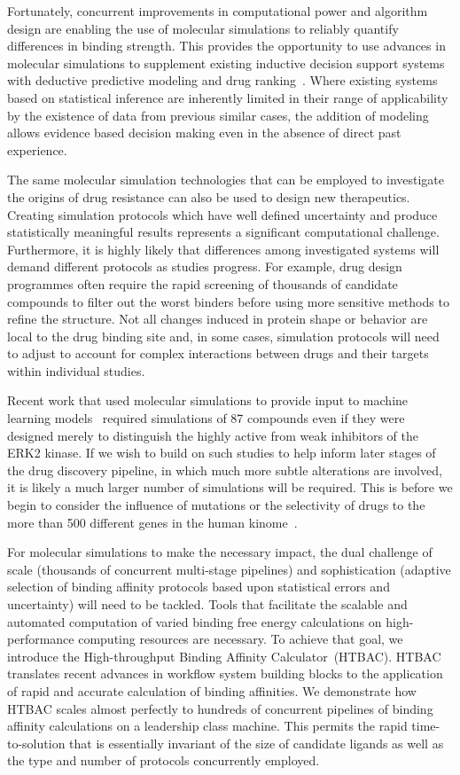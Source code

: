 Fortunately, concurrent improvements in computational power and algorithm
design are enabling the use of molecular simulations to reliably quantify
differences in binding strength. This provides the opportunity to use
advances in molecular simulations to supplement existing inductive decision
support systems with deductive predictive modeling and drug
ranking~\cite{Marias2011, Sloot2009}. Where existing systems based on
statistical inference are inherently limited in their range of applicability
by the existence of data from previous similar cases, the addition of
modeling allows evidence based decision making even in the absence of direct
past experience.

The same molecular simulation technologies that can be employed to
investigate the origins of drug resistance can also be used to design new
therapeutics. Creating simulation protocols which have well defined
uncertainty and produce statistically meaningful results represents a
significant computational challenge. Furthermore, it is highly likely that
differences among investigated systems will demand different protocols as
studies progress. For example, drug design programmes often require the rapid
screening of thousands of candidate compounds to filter out the worst binders
before using more sensitive methods to refine the structure. Not all changes
induced in protein shape or behavior are local to the drug binding site and,
in some cases, simulation protocols will need to adjust to account for
complex interactions between drugs and their targets within individual
studies.

Recent work that used molecular simulations to provide input to machine
learning models~\cite{Ash2017} required simulations of 87 compounds even if
they were designed merely to distinguish the highly active from weak
inhibitors of the ERK2 kinase. If we wish to build on such studies to help
inform later stages of the drug discovery pipeline, in which much more subtle
alterations are involved, it is likely a much larger number of simulations
will be required. This is before we begin to consider the influence of
mutations or the selectivity of drugs to the more than 500 different
genes in the human kinome~\cite{Li2016}.

For molecular simulations to make the necessary impact, the dual challenge of
scale (thousands of concurrent multi-stage pipelines) and sophistication
(adaptive selection of binding affinity protocols based upon statistical
errors and uncertainty) will need to be tackled. Tools that facilitate the
scalable and automated computation of varied binding free energy calculations
on high-performance computing resources are necessary. To achieve that goal,
we introduce the High-throughput Binding Affinity Calculator~(HTBAC). HTBAC
translates recent advances in workflow system building blocks to the
application of rapid and accurate calculation of  binding affinities. We
demonstrate how HTBAC scales  almost
perfectly to hundreds of concurrent pipelines of binding affinity
calculations on a leadership class machine. This permits the rapid
time-to-solution that is essentially invariant of the size of candidate
ligands as well as the type and number of protocols concurrently employed.

